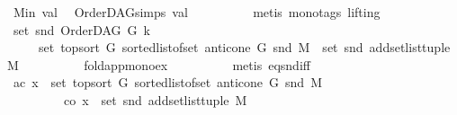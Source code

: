 \begin{isabellebody}
\ M{\isacharunderscore}{\kern0pt}in\ val\ \isamarkupfalse%
\ OrderDAG{\isachardot}{\kern0pt}simps\ val\isanewline
\ \ \ \ \ \ \ \ \isamarkupfalse%
\ {\isacharparenleft}{\kern0pt}metis\ {\isacharparenleft}{\kern0pt}mono{\isacharunderscore}{\kern0pt}tags{\isacharcomma}{\kern0pt}\ lifting{\isacharparenright}{\kern0pt}{\isacharparenright}{\kern0pt}\ \isanewline
\ \ \ \ \ \ \isamarkupfalse%
\ \isamarkupfalse%
\ {\isachardoublequoteopen}set\ {\isacharparenleft}{\kern0pt}snd\ {\isacharparenleft}{\kern0pt}OrderDAG\ G\ k{\isacharparenright}{\kern0pt}{\isacharparenright}{\kern0pt}\ \isanewline
\ \ \ \ {\isacharequal}{\kern0pt}\ set\ {\isacharparenleft}{\kern0pt}top{\isacharunderscore}{\kern0pt}sort\ G\ {\isacharparenleft}{\kern0pt}sorted{\isacharunderscore}{\kern0pt}list{\isacharunderscore}{\kern0pt}of{\isacharunderscore}{\kern0pt}set\ {\isacharparenleft}{\kern0pt}anticone\ G\ {\isacharparenleft}{\kern0pt}snd\ M{\isacharparenright}{\kern0pt}{\isacharparenright}{\kern0pt}{\isacharparenright}{\kern0pt}{\isacharparenright}{\kern0pt}\ {\isasymunion}\ set\ {\isacharparenleft}{\kern0pt}snd\ {\isacharparenleft}{\kern0pt}add{\isacharunderscore}{\kern0pt}set{\isacharunderscore}{\kern0pt}list{\isacharunderscore}{\kern0pt}tuple\ M{\isacharparenright}{\kern0pt}{\isacharparenright}{\kern0pt}{\isachardoublequoteclose}\isanewline
\ \ \ \ \ \ \ \ \isamarkupfalse%
\ fold{\isacharunderscore}{\kern0pt}app{\isacharunderscore}{\kern0pt}mono{\isacharunderscore}{\kern0pt}ex\isanewline
\ \ \ \ \ \ \ \ \isamarkupfalse%
\ {\isacharparenleft}{\kern0pt}metis\ eq{\isacharunderscore}{\kern0pt}snd{\isacharunderscore}{\kern0pt}iff{\isacharparenright}{\kern0pt}\isanewline
\ \ \ \ \isamarkupfalse%
\ \isamarkupfalse%
\ {\isacharparenleft}{\kern0pt}ac{\isacharparenright}{\kern0pt}\ {\isachardoublequoteopen}x\ {\isasymin}\ set\ {\isacharparenleft}{\kern0pt}top{\isacharunderscore}{\kern0pt}sort\ G\ {\isacharparenleft}{\kern0pt}sorted{\isacharunderscore}{\kern0pt}list{\isacharunderscore}{\kern0pt}of{\isacharunderscore}{\kern0pt}set\ {\isacharparenleft}{\kern0pt}anticone\ G\ {\isacharparenleft}{\kern0pt}snd\ M{\isacharparenright}{\kern0pt}{\isacharparenright}{\kern0pt}{\isacharparenright}{\kern0pt}{\isacharparenright}{\kern0pt}{\isachardoublequoteclose}\ \isanewline
\ \ \ \ \ \ \ \ {\isacharbar}{\kern0pt}\ {\isacharparenleft}{\kern0pt}co{\isacharparenright}{\kern0pt}\ {\isachardoublequoteopen}x\ {\isasymin}\ set\ {\isacharparenleft}{\kern0pt}snd\ {\isacharparenleft}{\kern0pt}add{\isacharunderscore}{\kern0pt}set{\isacharunderscore}{\kern0pt}list{\isacharunderscore}{\kern0pt}tuple\ M{\isacharparenright}{\kern0pt}{\isacharparenright}{\kern0pt}{\isachardoublequoteclose}\ \isanewline

\end{isabellebody}
